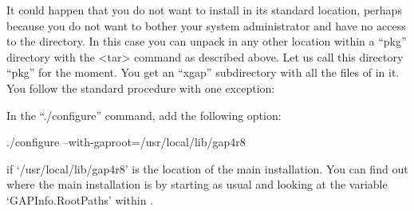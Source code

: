 It could happen that you do not want to install {\XGAP} in its
standard location, perhaps because you do not want to bother your
system administrator and have no access to the {\GAP} directory. In
this case you can unpack {\XGAP} in any other location within a
``pkg'' directory with the <tar> command as described above. Let us
call this directory ``pkg'' for the moment. You get an ``xgap''
subdirectory with all the files of {\XGAP} in it. You follow the
standard procedure with one exception:

In the ``./configure'' command, add the following option:

\begintt
./configure --with-gaproot=/usr/local/lib/gap4r8
\endtt

if `/usr/local/lib/gap4r8' is the location of the main {\GAP} installation.
You can find out where the main {} installation is by starting 
{\GAP} as usual and looking at the variable `GAPInfo.RootPaths' 
within {\GAP}.
